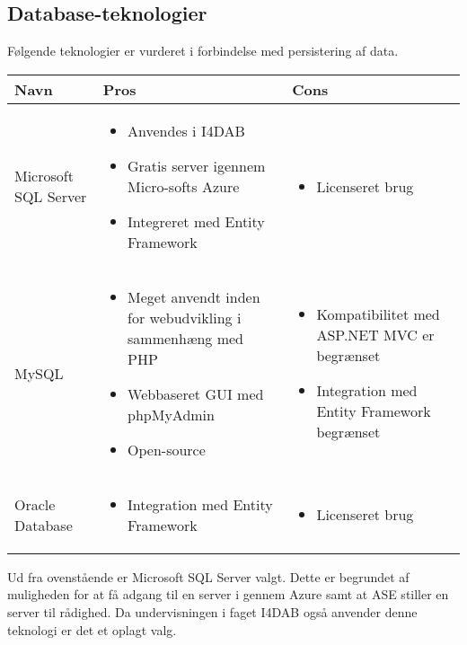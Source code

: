 \subsection*{Database-teknologier}

Følgende teknologier er vurderet i forbindelse med persistering af data.

\begin{savenotes}
\begin{tabular}{|p{3cm}|p{5.5cm}|p{5.5cm}|}
\hline 
\textbf{Navn} & \textbf{Pros} & \textbf{Cons} \\ 
\hline

Microsoft SQL Server
	&
	\begin{itemize}
		\item Anvendes i I4DAB
		\item Gratis server igennem Micro-softs Azure \citep{msazureWeb}
		\item Integreret med Entity Framework
	\end{itemize}
	&
	\begin{itemize}
		\item Licenseret brug
	\end{itemize}
	\\
	\hline

MySQL
	&
	\begin{itemize}
		\item Meget anvendt inden for webudvikling i sammenhæng med PHP
		\item Webbaseret GUI med phpMyAdmin \citep{phpMyAdminWeb}
		\item Open-source
	\end{itemize}
	&
	\begin{itemize}
		\item Kompatibilitet med ASP.NET MVC er begrænset
		\item Integration med Entity Framework begrænset
	\end{itemize}
	\\
	\hline

Oracle Database
	&
	\begin{itemize}
		\item Integration med Entity Framework
	\end{itemize}
	&
	\begin{itemize}
	\item Licenseret brug
	\end{itemize}
	\\
	\hline
\end{tabular}
\end{savenotes} 

Ud fra ovenstående er Microsoft SQL Server valgt. Dette er begrundet af muligheden for at få adgang til en server i gennem Azure samt at ASE stiller en server til rådighed. Da undervisningen i faget I4DAB også anvender denne teknologi er det et oplagt valg.